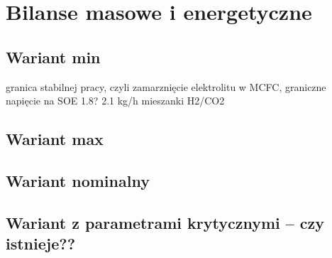 \section{Bilanse masowe i energetyczne }

\subsection{Wariant min}
granica stabilnej pracy, czyli 
zamarznięcie elektrolitu w MCFC, 
graniczne napięcie na SOE 1.8?
2.1 kg/h mieszanki H2/CO2


\subsection{Wariant max}

\subsection{Wariant nominalny}

\subsection{Wariant z parametrami krytycznymi – czy istnieje??}